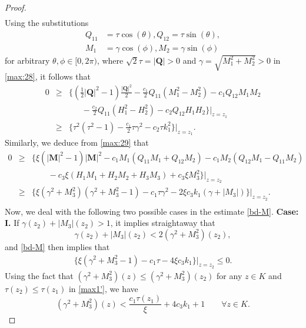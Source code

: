 \documentclass{article}
\def\Qvec{\mathbf{Q}}
\def \Mvec{\mathbf{M}}
\begin{document}
\begin{proof}
\begin{eqnarray}
\end{eqnarray}
Using the substitutions \begin{eqnarray}
Q_{11}&=\tau \cos\left(\theta\right), Q_{12}=\tau \sin\left(\theta\right),\nonumber\\
M_1&=\gamma \cos\left(\phi\right), M_2=\gamma \sin\left(\phi\right)
\end{eqnarray}
for arbitrary $\theta, \phi\in [0, 2\pi)$, where $\sqrt{2}\tau=|\Qvec|>0$ and $\gamma=\sqrt{M_1^2+M_2^2}>0$ in \eqref{max:28}, it follows that  
\begin{eqnarray} \label{eq:max2}
0 &\geq& \bigg\{\left(\frac{1}{2}|\Qvec|^2-1\right)\frac{|\Qvec|^2}{2}-\frac{c_1}{2}Q_{11}(M_1^2 - M_2^2) -c_1Q_{12}M_1M_2\nonumber\\ &&~~~~~~~ -\frac{c_2}{2}Q_{11}\left(H_1^2-H_2^2\right)-c_2Q_{12}H_1H_2\bigg\}\bigg|_{z=z_1}\\
&\geq & \bigg\{\tau^2(\tau^2 -1 ) - \frac{c_1}{2} \tau \gamma^2 - c_2 \tau k_1^2\bigg\} \bigg|_{z=z_1}. \nonumber
\end{eqnarray}
Similarly, we deduce from \eqref{max:29} that
\begin{eqnarray}\label{bd-M}
0 &\geq& \bigg\{\xi\left(|\Mvec|^2-1\right)|\Mvec|^2-c_1M_1\left(Q_{11}M_1+Q_{12}M_2\right)-c_1M_2\left(Q_{12}M_1-Q_{11}M_2\right)\nonumber\\
&&~~~~~~~~~ -c_3\xi\left(H_1M_1+H_2M_2+H_3M_3\right)+c_3\xi M_3^2\bigg\}\bigg|_{z=z_2}\nonumber\\
&\geq& \bigg\{\xi(\gamma^2 + M_3^2)\left(\gamma^2 + M_3^2 - 1 \right) - c_1\tau\gamma^2 - 2\xi c_3 k_1 \left(\gamma + |M_3| \right)\bigg\}\bigg|_{z=z_2}.\nonumber\\
\end{eqnarray}
Now, we deal with the following two possible cases in the estimate \eqref{bd-M}.\newline
\textbf{Case: I.}
If
$\gamma(z_2) + |M_3|(z_2)> 1$, it implies straightaway that
\[
\gamma(z_2) + |M_3|(z_2) < 2\left(\gamma^2 + M_3^2 \right)(z_2),
\]
and \eqref{bd-M} then implies that
\begin{eqnarray}
\bigg\{\xi\left(\gamma^2 + M_3^2 - 1 \right) - c_1\tau - 4\xi c_3k_1\bigg\}\bigg|_{z=z_2}\le 0.\label{max1'}
\end{eqnarray}
Using the fact that $\left(\gamma^2 + M_3^2\right)(z)\leq \left(\gamma^2 + M_3^2\right)(z_2)$ for any $z\in K$ and $\tau(z_2) \leq \tau(z_1)$ in \eqref{max1'}, we have
\begin{equation}
\label{eq:max1}
\left(\gamma^2 + M_3^2\right)(z) < \frac{c_1\tau(z_1)}{\xi} + 4 c_3k_1 + 1 \qquad \forall z \in K.

\end{equation}
\end{proof}
\end{document}
